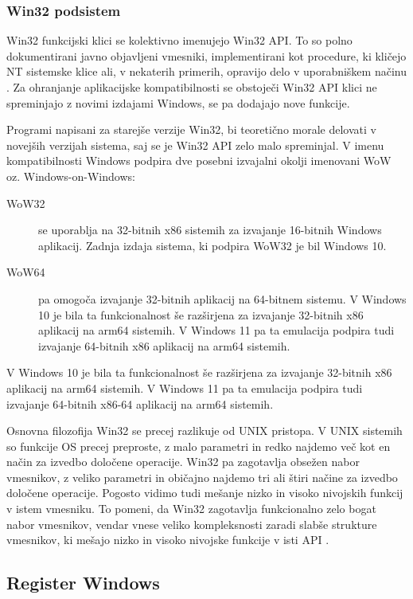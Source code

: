 \documentclass[a4paper,12pt,openright]{book}
\begin{document}
\subsubsection{Win32 podsistem}

Win32 funkcijski klici se kolektivno imenujejo Win32 API.
To so polno dokumentirani javno objavljeni vmesniki, implementirani kot procedure, ki kličejo NT sistemske klice ali, v nekaterih primerih, opravijo delo v uporabniškem načinu \cite{Tanenbaum_Bos_2023}.
Za ohranjanje aplikacijske kompatibilnosti se obstoječi Win32 API klici ne spreminjajo z novimi izdajami Windows, se pa dodajajo nove funkcije.

Programi napisani za starejše verzije Win32, bi teoretično morale delovati v novejših verzijah sistema, saj se je Win32 API zelo malo spreminjal.
V imenu kompatibilnosti Windows podpira dve posebni izvajalni okolji imenovani WoW oz. Windows-on-Windows:
\begin{description}
	\item[WoW32] se uporablja na 32-bitnih x86 sistemih za izvajanje 16-bitnih Windows aplikacij. Zadnja izdaja sistema, ki podpira WoW32 je bil Windows 10.
	\item[WoW64] pa omogoča izvajanje 32-bitnih aplikacij na 64-bitnem sistemu.
	V Windows 10 je bila ta funkcionalnost še razširjena za izvajanje 32-bitnih x86 aplikacij na arm64 sistemih.
	V Windows 11 pa ta emulacija podpira tudi izvajanje 64-bitnih x86 aplikacij na arm64 sistemih.
\end{description}
V Windows 10 je bila ta funkcionalnost še razširjena za izvajanje 32-bitnih x86 aplikacij na arm64 sistemih.
V Windows 11 pa ta emulacija podpira tudi izvajanje 64-bitnih x86-64 aplikacij na arm64 sistemih.

Osnovna filozofija Win32 se precej razlikuje od UNIX pristopa.
V UNIX sistemih so funkcije OS precej preproste, z malo parametri in redko najdemo več kot en način za izvedbo določene operacije.
Win32 pa zagotavlja obsežen nabor vmesnikov, z veliko parametri in običajno najdemo tri ali štiri načine za izvedbo določene operacije.
Pogosto vidimo tudi mešanje nizko in visoko nivojskih funkcij v istem vmesniku.
To pomeni, da Win32 zagotavlja funkcionalno zelo bogat nabor vmesnikov, vendar vnese veliko kompleksnosti zaradi slabše strukture vmesnikov, ki mešajo nizko in visoko nivojske funkcije v isti API \cite{Tanenbaum_Bos_2023}.

\subsection{Register Windows}
\end{document}
